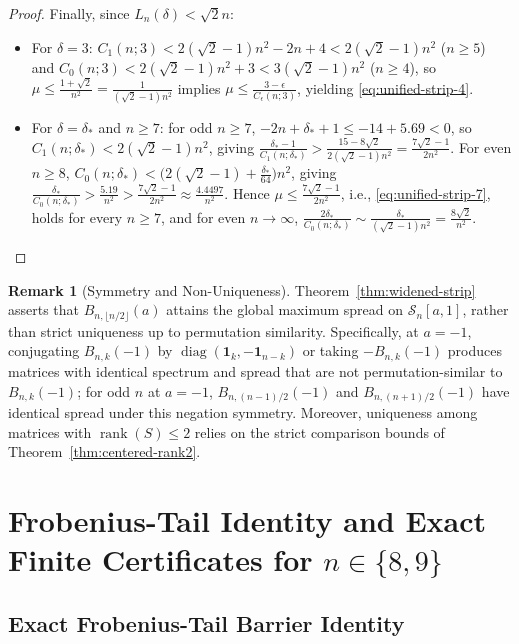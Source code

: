 \documentclass[11pt,reqno]{article}
\theoremstyle{definition}
\newtheorem{remark}[theorem]{Remark}
\newcommand{\one}{\mathbf{1}}
\newcommand{\diag}{\operatorname{diag}}
\newcommand{\rank}{\operatorname{rank}}
\begin{document}
\begin{proof}
Finally, since $L_n(\delta) < \sqrt{2}n$:
\begin{itemize}
    \item For $\delta = 3$: $C_1(n; 3) < 2(\sqrt{2}-1)n^2 - 2n + 4 < 2(\sqrt{2}-1)n^2$ ($n \ge 5$) and $C_0(n; 3) < 2(\sqrt{2}-1)n^2 + 3 < 3(\sqrt{2}-1)n^2$ ($n \ge 4$), so $\mu \le \frac{1+\sqrt{2}}{n^2} = \frac{1}{(\sqrt{2}-1)n^2}$ implies $\mu \le \frac{3 - \epsilon}{C_\epsilon(n; 3)}$, yielding \eqref{eq:unified-strip-4}.
    \item For $\delta = \delta_*$ and $n \ge 7$: for odd $n \ge 7$, $-2n + \delta_* + 1 \le -14 + 5.69 < 0$, so $C_1(n; \delta_*) < 2(\sqrt{2}-1)n^2$, giving $\frac{\delta_* - 1}{C_1(n; \delta_*)} > \frac{15 - 8\sqrt{2}}{2(\sqrt{2}-1)n^2} = \frac{7\sqrt{2} - 1}{2n^2}$. For even $n \ge 8$, $C_0(n; \delta_*) < \bigl(2(\sqrt{2}-1) + \frac{\delta_*}{64}\bigr)n^2$, giving $\frac{\delta_*}{C_0(n; \delta_*)} > \frac{5.19}{n^2} > \frac{7\sqrt{2}-1}{2n^2} \approx \frac{4.4497}{n^2}$. Hence $\mu \le \frac{7\sqrt{2}-1}{2n^2}$, i.e., \eqref{eq:unified-strip-7}, holds for every $n \ge 7$, and for even $n \to \infty$, $\frac{2\delta_*}{C_0(n; \delta_*)} \sim \frac{\delta_*}{(\sqrt{2}-1)n^2} = \frac{8\sqrt{2}}{n^2}$. \qedhere
\end{itemize}
\end{proof}

\begin{remark}[Symmetry and Non-Uniqueness]\label{rem:symmetry}
Theorem~\ref{thm:widened-strip} asserts that $B_{n, \lfloor n/2 \rfloor}(a)$ attains the global maximum spread on $\mathcal{S}_n[a, 1]$, rather than strict uniqueness up to permutation similarity. Specifically, at $a = -1$, conjugating $B_{n, k}(-1)$ by $\diag(\one_k, -\one_{n-k})$ or taking $-B_{n, k}(-1)$ produces matrices with identical spectrum and spread that are not permutation-similar to $B_{n, k}(-1)$; for odd $n$ at $a = -1$, $B_{n, (n-1)/2}(-1)$ and $B_{n, (n+1)/2}(-1)$ have identical spread under this negation symmetry. Moreover, uniqueness among matrices with $\rank(S) \le 2$ relies on the strict comparison bounds of Theorem~\ref{thm:centered-rank2}.
\end{remark}

\section{Frobenius-Tail Identity and Exact Finite Certificates for \texorpdfstring{$n \in \{8, 9\}$}{n in \{8, 9\}}}

\subsection{Exact Frobenius-Tail Barrier Identity}
\end{document}
